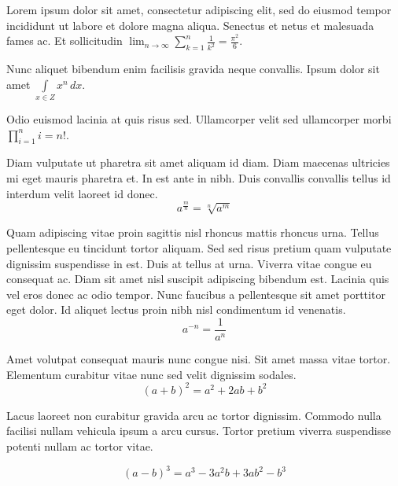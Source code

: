 \documentclass{article}
\begin{document}
Lorem ipsum dolor sit amet, consectetur adipiscing elit, sed do eiusmod tempor incididunt ut labore et dolore magna aliqua. Senectus et netus et malesuada fames ac. Et sollicitudin \begin{math}
	\lim_{n \to \infty}\sum_{k=1}^n \frac{1}{k^2}= \frac{\pi^2}{6}
\end{math}.\newline
 
Nunc aliquet bibendum enim facilisis gravida neque convallis. Ipsum dolor sit amet $ \int\limits_{x\in Z}\! x^{n}\, dx $.\newline
    
Odio euismod lacinia at quis risus sed. Ullamcorper velit sed ullamcorper morbi \( \prod_{i=1}^ni=n! \).\newline

Diam vulputate ut pharetra sit amet aliquam id diam. Diam maecenas ultricies mi eget mauris pharetra et. In est ante in nibh. Duis convallis convallis tellus id interdum velit laoreet id donec. 
\[ a^{\frac{m}{n}}=\sqrt[n]{a^{m}} \]

Quam adipiscing vitae proin sagittis nisl rhoncus mattis rhoncus urna. Tellus pellentesque eu tincidunt tortor aliquam. Sed sed risus pretium quam vulputate dignissim suspendisse in est. Duis at tellus at urna. Viverra vitae congue eu consequat ac. Diam sit amet nisl suscipit adipiscing bibendum est. Lacinia quis vel eros donec ac odio tempor. Nunc faucibus a pellentesque sit amet porttitor eget dolor. Id aliquet lectus proin nibh nisl condimentum id venenatis.
$$ a^{-n}=\frac{1}{a^{n}} $$

Amet volutpat consequat mauris nunc congue nisi. Sit amet massa vitae tortor. Elementum curabitur vitae nunc sed velit dignissim sodales. 
\begin{displaymath}
	(a+b)^{2}=a^{2}+2ab+b^{2}
\end{displaymath}

Lacus laoreet non curabitur gravida arcu ac tortor dignissim. Commodo nulla facilisi nullam vehicula ipsum a arcu cursus. Tortor pretium viverra suspendisse potenti nullam ac tortor vitae. 

\begin{equation}
	(a-b)^{3}=a^{3}-3a^{2}b+3ab^{2}-b^{3}
\end{equation}
\end{document}
